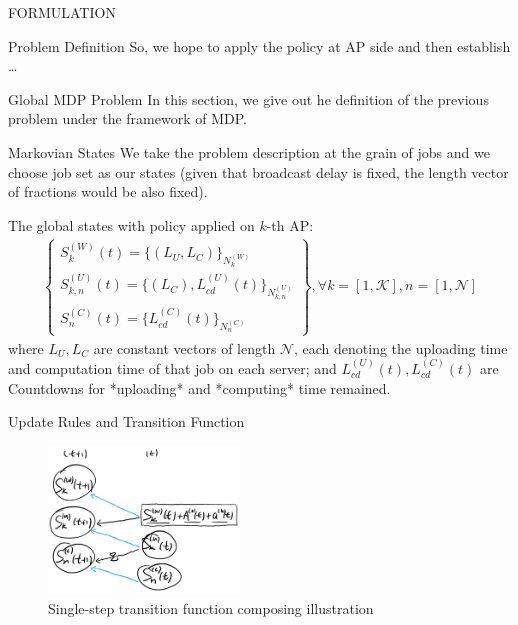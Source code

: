 \documentclass[10pt, conference, letterpaper]{IEEEtran}
\begin{document}
\begin{section}{FORMULATION}
\begin{subsection}{Problem Definition}
            So, we hope to apply the policy at AP side and then establish \dots
        \end{subsection}

        \begin{subsection}{Global MDP Problem}
            In this section, we give out he definition of the previous problem under the framework of MDP.

            \begin{subsubsection}{Markovian States}
                We take the problem description at the grain of jobs and we choose job set as our states (given that broadcast delay is fixed, the length vector of fractions would be also fixed).

                The global states with policy applied on $k$-th AP:
                \begin{gather*}
                    \begin{Bmatrix}
                        S_{k}^{(W)}(t) = \{ (L_U, L_C) \}_{N_{k}^{(W)}}
                        \\
                        S_{k,n}^{(U)}(t)= \{ (L_C), L_{cd}^{(U)}(t) \}_{N_{k,n}^{(U)}}
                        \\
                        S_{n}^{(C)}(t)  = \{ L_{cd}^{(C)}(t) \}_{N_{n}^{(C)}}
                    \end{Bmatrix},
                    \forall k=[1,\mathcal{K}], n=[1,\mathcal{N}]
                \end{gather*}
                where $L_U, L_C$ are constant vectors of length $\mathcal{N}$, each denoting the uploading time and computation time of that job on each server; and $L^{(U)}_{cd}(t), L^{(C)}_{cd}(t)$ are Countdowns for *uploading* and *computing* time remained.
            \end{subsubsection}

            \begin{subsubsection}{Update Rules and Transition Function}
                \begin{figure}[h]
                    \centering
                    \includegraphics[width=0.45\textwidth]{single-transition.png}
                    \caption{Single-step transition function composing illustration}
                    \label{fig:trans}
                \end{figure}


\end{subsubsection}
\end{subsection}
\end{section}
\end{document}

